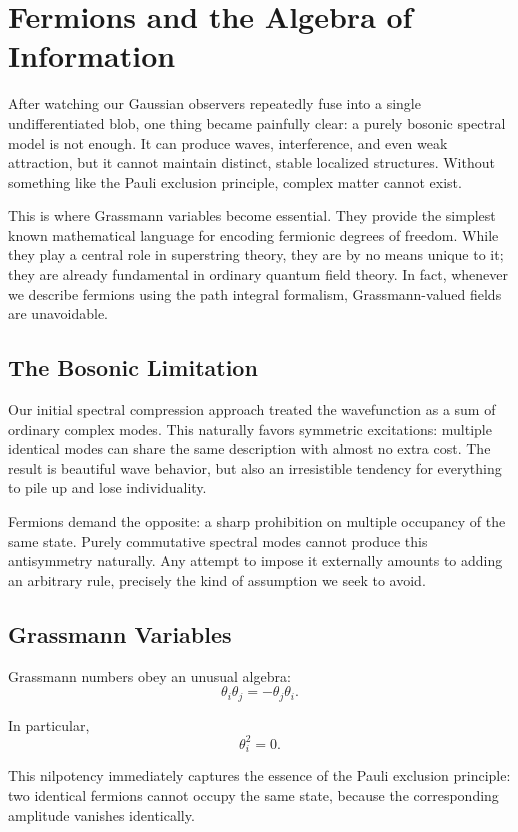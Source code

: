 \chapter{Fermions and the Algebra of Information}

After watching our Gaussian observers repeatedly fuse into a single undifferentiated blob, one thing became painfully clear: a purely bosonic spectral model is not enough. It can produce waves, interference, and even weak attraction, but it cannot maintain distinct, stable localized structures. Without something like the Pauli exclusion principle, complex matter cannot exist.

This is where Grassmann variables become essential. They provide the simplest known mathematical language for encoding fermionic degrees of freedom. While they play a central role in superstring theory, they are by no means unique to it; they are already fundamental in ordinary quantum field theory. In fact, whenever we describe fermions using the path integral formalism, Grassmann-valued fields are unavoidable.

\section{The Bosonic Limitation}

Our initial spectral compression approach treated the wavefunction as a sum of ordinary complex modes. This naturally favors symmetric excitations: multiple identical modes can share the same description with almost no extra cost. The result is beautiful wave behavior, but also an irresistible tendency for everything to pile up and lose individuality.

Fermions demand the opposite: a sharp prohibition on multiple occupancy of the same state. Purely commutative spectral modes cannot produce this antisymmetry naturally. Any attempt to impose it externally amounts to adding an arbitrary rule, precisely the kind of assumption we seek to avoid.

\section{Grassmann Variables}

Grassmann numbers obey an unusual algebra:
\[
\theta_i \theta_j = -\theta_j \theta_i.
\]

In particular,
\[
\theta_i^2 = 0.
\]

This nilpotency immediately captures the essence of the Pauli exclusion principle: two identical fermions cannot occupy the same state, because the corresponding amplitude vanishes identically.

